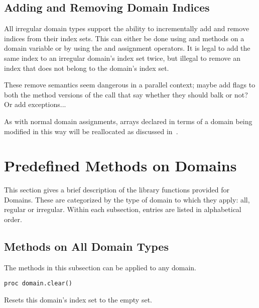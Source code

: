 \subsection{Adding and Removing Domain Indices}
\label{Adding_and_Removing_Domain_Indices}

All irregular domain types support the ability to incrementally add
and remove indices from their index sets.  This can either be done
using  and  methods on a
domain variable or by using the \chpl{+=} and \chpl{-=} assignment
operators.  It is legal to add the same index to an irregular domain's
index set twice, but illegal to remove an index that does not belong
to the domain's index set.

\begin{openissue}
These remove semantics seem dangerous in a parallel context; maybe
add flags to both the method versions of the call that say whether
they should balk or not?  Or add exceptions...
\end{openissue}

As with normal domain assignments, arrays declared in terms of a
domain being modified in this way will be reallocated as discussed
in~.



\section{Predefined Methods on Domains}

This section gives a brief description of the library functions provided for
Domains.  These are categorized by the type of domain to which they apply: all,
regular or irregular.  Within each subsection, entries are listed in
alphabetical order.

\subsection{Methods on All Domain Types}

The methods in this subsection can be applied to any domain.

\begin{protohead}
\begin{verbatim}
proc domain.clear()
\end{verbatim}
\end{protohead}
\begin{protobody}
Resets this domain's index set to the empty set.
\end{protobody}

